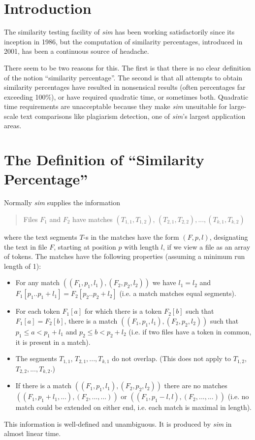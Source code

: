 \documentclass[a4paper,fleqn]{article}
\title{\mytitle}
\author{Dick Grune \\
dick@dickgrune.com}
\date{May 18, 2016}
\renewcommand{\sim}[0]{{\it sim}}
\begin{document}
\maketitle

\section{Introduction}

The similarity testing facility of {\sim} has been working satisfactorily
since its inception in 1986, but the computation of similarity percentages,
introduced in 2001, has been a continuous source of headache.

There seem to be two reasons for this. The first is that there is no clear
definition of the notion ``similarity percentage''.
The second is that all
attempts to obtain similarity percentages have resulted in nonsensical results
(often percentages far exceeding 100\%), or have required quadratic time, or
sometimes both. Quadratic time requirements are unacceptable because they
make {\sim} unsuitable for large-scale text comparisons like
plagiarism detection, one of {\sim}'s largest application areas.

\section{The Definition of ``Similarity Percentage''}

Normally {\sim} supplies the information
\begin{quote}
Files $F_1$ and $F_2$ have matches
$(T_{1,1}, T_{1,2})$, $(T_{2,1}, T_{2,2}), ..., (T_{k,1}, T_{k,2})$
\end{quote}
where the text segments $T$-s in the matches have the form $(F, p, l)$,
designating the text in file $F$, starting at position $p$ with length $l$,
if we view a file as an array of tokens.
The matches have the following properties (assuming a minimum run length of 1):
\begin{itemize}
\item
For any match $((F_1, p_1, l_1), (F_2, p_2, l_2))$ we have $l_1 = l_2$ and
$F_1[p_1..p_1+l_1] = F_2[p_2..p_2+l_2]$ (i.e. a match matches equal segments).
\item
For each token $F_1[a]$ for which there is a token $F_2[b]$ such that
$F_1[a]=F_2[b]$, there is a match $((F_1, p_1, l_1), (F_2, p_2, l_2))$ such
that $p_1 \leq a < p_1+l_1$ and $p_2 \leq b < p_2+l_2$
(i.e. if two files have a token in common, it is present in a match).
\item
The segments $T_{1,1}$, $T_{2,1}, ..., T_{k,1}$ do not overlap. (This does not
apply to $T_{1,2}$, $T_{2,2}, ..., T_{k,2}$.)
\item
If there is a match $((F_1, p_1, l_1), (F_2, p_2, l_2))$ there are no matches
$((F_1, p_1 + l_1, ...), (F_2, ..., ...))$ or
$((F_1, p_1-l, l), (F_2, ..., ...))$ (i.e. no match could be extended on either
end, i.e. each match is maximal in length).
\end{itemize}
This information is well-defined and unambiguous.
It is produced by {\sim} in almost linear time.
\end{document}
